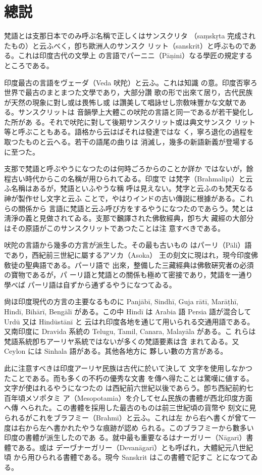 \chapter*{總説}
\label{cha:general}

\numberParagraph
梵語とは支那日本でのみ呼ぶ名稱で正しくはサンスクリタ
（saṃskṛta 完成されたもの）と云ふべく，卽ち歐洲人のサンスク
リット（sanskrit）と呼ぶものである。これは印度古代の文學上
の言語でパーニニ（Pāṇini）なる學匠の規定するところである。

印度最古の言語をヴェーダ（Veda 吠陀）と云ふ。これは知識
の意。印度否寧ろ世界で最古のまとまつた文學であり，大部分讚
歌の形で出來て居り，古代民族が天然の現象に對し或は畏怖し或
は讚美して唱詠せし宗敎味豐かな文献である。サンスクリットは
音韻學上大體この吠陀の言語と同一であるが若干變化した所があ
る。それで吠陀に對して後期サンスクリット或は典文サンスク
リット等と呼ぶこともある。語格から云はばそれは發達ではな
く，寧ろ退化の過程を取つたものと云へる。若干の語尾の曲りは
消滅し，幾多の新語新義が登場するに至つた。

支那で梵語と呼ぶやうになつたのは何時ごろからのことか詳か
ではないが，餘程古い時代からこの名稱が用ひられてゐる。印度で
は梵字（Brahmalipi）と云ふ名稱はあるが，梵語といふやうな稱
呼は見えない。梵字と云ふのも梵天なる神が製作せし文字と云ふ
ことで，やはりインドの古い傳説に根據がある。これらの關係から
言語に梵語と云ふ呼び方をするやうになつたのであらう。梵とは
淸淨の義と見做されてゐる。支那で飜譯された佛敎經典，卽ち大
藏經の大部分はその原語がこのサンスクリットであつたことは注
意すべきである。

\numberParagraph
吠陀の言語から幾多の方言が派生した。その最も古いもの
はパーリ（Pāli）語であり，西紀前三世紀に屬するアソカ（Asoka）
王の刻文に現はれ，現今印度佛敎徒の聖典語である。パーリ語で
出來，整備した三藏經典は佛敎硏究者の必須の寶物であるが，パ
ーリ語と梵語との關係も極めて密接であり，梵語を一通り學べば
パーリ語は自ずから通ずるやうになつてゐる。

尙ほ印度現代の方言の主要なるものに Panjābī, Sindhī, Guja\-%
rātī, Marāṭhī, Hindī, Bihārī, Bengālī がある。この中 Hindī
は Arabia 語 Persia 語が混合して Urdū 又は Hindūstānī と
云はれ印度各地を通じて用いられる交通用語である。又南印度に
Dravida 系統の Telugu, Tamil, Canara, Malayāla がある。こ
れらは梵語系統卽ちアーリヤ系統ではないが多くの梵語要素は含
まれてゐる。又 Ceylon には Sinhala 語がある。其他各地方に
夥しい數の方言がある。

\numberParagraph
此に注意すべきは印度アーリヤ民族は古代に於いて決して
文字を使用しなかつたことである。而も多くの不朽の優秀な文書
を傳へ得たことは驚嘆に値する。文字が使はれるやうになつたの
は西紀前六世紀以後であらう。卽ち西紀前約七百年頃メソポタミ
ア（Mesopotamia）を介してセム民族の書體が西北印度方面へ傳
へられた。この書體を採用した最古のものは前三世紀頃の貨幣や
刻文に見られるがこれをブラフミー（Brahmī）と云ふ。これは左
から右へ書くが曾て一度は右から左へ書かれたやうな痕跡が認め
られる。このブラフミーから數多い印度の書體が派生したのであ
る。就中最も重要なるはナーガリー（Nāgarī）書體である。或は
デーヷナーガリー（Devanāgarī）とも呼ばれ，大體紀元八世紀頃
から用ひられる書體である。現今 Sanskrit はこの書體で記すこ
とになつてゐる。

